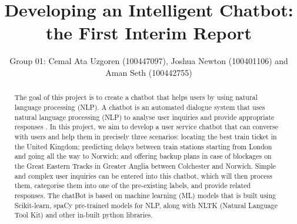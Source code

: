 \documentclass[11pt]{article}
\title{Developing an Intelligent Chatbot: the First Interim Report}
\author{Group 01: Cemal Ata Uzgoren (100447097), Joshua Newton (100401106) and Aman Seth (100442755)}
\begin{document}
\maketitle

\tableofcontents
\newpage

\begin{abstract}
The goal of this project is to create a chatbot that helps users by using natural language processing (NLP). A chatbot is an automated dialogue system that uses natural language processing (NLP) to analyse user inquiries and provide appropriate responses %
. In this project, we aim to develop a user service chatbot that can converse with users and help them in precisely three scenarios: locating the best train ticket in the United Kingdom; predicting delays between train stations starting from London and going all the way to Norwich; and offering backup plans in case of blockages on the Great Eastern Tracks in Greater Anglia between Colchester and Norwich. Simple and complex user inquiries can be entered into this chatbot, which will then process them, categorise them into one of the pre-existing labels, and provide related responses. The chatBot is based on machine learning (ML) models that is built using Scikit-learn, spaCy pre-trained models for NLP, along with NLTK (Natural  Language  Tool  Kit) and other in-built python libraries. 

\end{abstract}











%
 

\newpage

\end{document}
